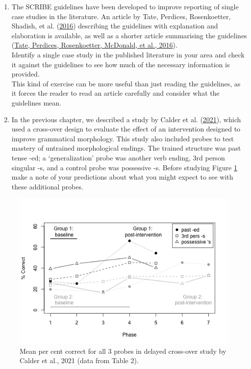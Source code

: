 \documentclass{krantz}
\begin{document}
\begin{enumerate}
\def\labelenumi{\arabic{enumi}.}
\setcounter{enumi}{1}
\item
  The SCRIBE guidelines  have been developed to improve reporting of single case studies in the literature. An article by Tate, Perdices, Rosenkoetter, Shadish, et al. (\protect\hyperlink{ref-tate2016}{2016}) describing the guidelines with explanation and elaboration is available, as well as a shorter article summarising the guidelines (\protect\hyperlink{ref-tate2016a}{Tate, Perdices, Rosenkoetter, McDonald, et al., 2016}).\\
  Identify a single case study in the published literature in your area and check it against the guidelines to see how much of the necessary information is provided.\\
  This kind of exercise can be more useful than just reading the guidelines, as it forces the reader to read an article carefully and consider what the guidelines mean.
\item
  In the previous chapter, we described a study by Calder et al. (\protect\hyperlink{ref-calder2021}{2021}), which used a cross-over design to evaluate the effect of an intervention designed to improve grammatical morphology. This study also included probes to test mastery of untrained morphological endings. The trained structure was past tense -ed; a `generalization' probe was another verb ending, 3rd person singular -s, and a control probe was possessive -s. Before studying Figure \ref{fig:Calderplus} make a note of your predictions about what you might expect to see with these additional probes.
\end{enumerate}

\begin{figure}
\includegraphics[width=0.85\linewidth]{images_bw/calderfig-2} \caption{Mean per cent correct for all 3 probes in delayed cross-over study by Calder et al., 2021 (data from Table 2).}\label{fig:Calderplus}
\end{figure}
\end{document}
